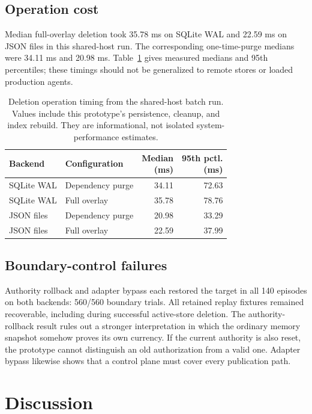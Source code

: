 ﻿\documentclass[sigconf,nonacm]{acmart}
\begin{document}
\subsection{Operation cost}
Median full-overlay deletion took 35.78 ms on SQLite WAL and 22.59 ms on JSON files in this shared-host run. The corresponding one-time-purge medians were 34.11 ms and 20.98 ms. Table~\ref{tab:timing} gives measured medians and 95th percentiles; these timings should not be generalized to remote stores or loaded production agents.
\begin{table}[t]
\caption{Deletion operation timing from the shared-host batch run. Values include this prototype's persistence, cleanup, and index rebuild. They are informational, not isolated system-performance estimates.}
\label{tab:timing}
\centering\small\setlength{\tabcolsep}{3pt}
\begin{tabular}{llrr}
\toprule
Backend & Configuration & \shortstack[r]{Median\\(ms)} & \shortstack[r]{95th pctl.\\(ms)} \\
\midrule
SQLite WAL & Dependency purge & 34.11 & 72.63 \\
SQLite WAL & Full overlay & 35.78 & 78.76 \\
JSON files & Dependency purge & 20.98 & 33.29 \\
JSON files & Full overlay & 22.59 & 37.99 \\
\bottomrule
\end{tabular}
\end{table}

\subsection{Boundary-control failures}
Authority rollback and adapter bypass each restored the target in all 140 episodes on both backends: 560/560 boundary trials. All retained replay fixtures remained recoverable, including during successful active-store deletion. The authority-rollback result rules out a stronger interpretation in which the ordinary memory snapshot somehow proves its own currency. If the current authority is also reset, the prototype cannot distinguish an old authorization from a valid one. Adapter bypass likewise shows that a control plane must cover every publication path.

\section{Discussion}
\end{document}
